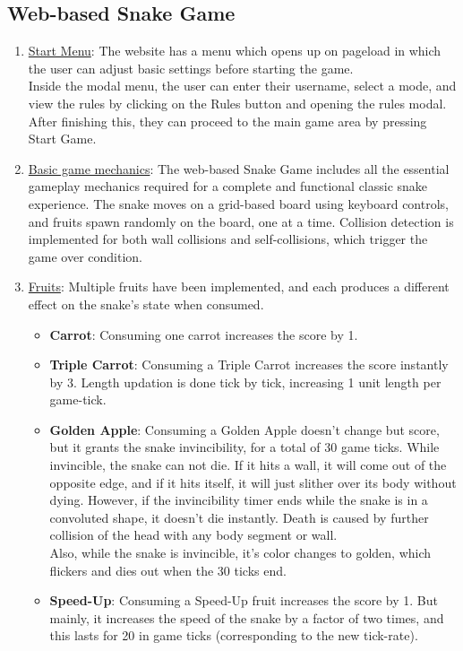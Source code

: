 \documentclass[12pt]{article}
\begin{document}
\subsection{Web-based Snake Game}
\begin{enumerate}
    \item \underline{Start Menu}:
    The website has a menu which opens up on pageload in which the user can adjust basic settings before starting the game.\\
    Inside the modal menu, the user can enter their username, select a mode, and view the rules by clicking on the Rules button and opening the rules modal. After finishing this, they can proceed to the main game area by pressing Start Game.\\

    \item \underline{Basic game mechanics}:
    The web-based Snake Game includes all the essential gameplay mechanics required for a complete and functional classic snake experience. The snake moves on a grid-based board using keyboard controls, and fruits spawn randomly on the board, one at a time. Collision detection is implemented for both wall collisions and self-collisions, which trigger the game over condition.

    \item \underline{Fruits}:
    Multiple fruits have been implemented, and each produces a different effect on the snake's state when consumed. 
    \begin{itemize}
        \item \textbf{Carrot}: Consuming one carrot increases the score by 1.
        \item \textbf{Triple Carrot}: Consuming a Triple Carrot increases the score instantly by 3. Length updation is done tick by tick, increasing 1 unit length per game-tick.
        \item \textbf{Golden Apple}: Consuming a Golden Apple doesn't change but score, but it grants the snake invincibility, for a total of 30 game ticks. While invincible, the snake can not die. If it hits a wall, it will come out of the opposite edge, and if it hits itself, it will just slither over its body without dying. However, if the invincibility timer ends while the snake is in a convoluted shape, it doesn't die instantly. Death is caused by further collision of the head with any body segment or wall. \\
        Also, while the snake is invincible, it's color changes to golden, which flickers and dies out when the 30 ticks end. 
        \item \textbf{Speed-Up}: Consuming a Speed-Up fruit increases the score by 1. But mainly, it increases the speed of the snake by a factor of two times, and this lasts for 20 in game ticks (corresponding to the new tick-rate).
    \end{itemize}


\end{enumerate}
\end{document}

